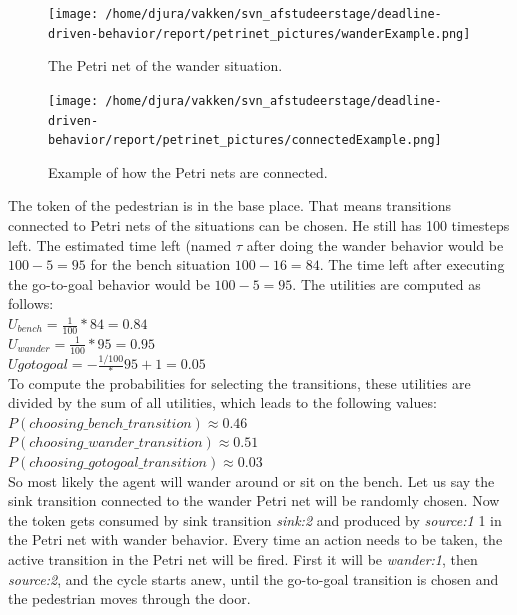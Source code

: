 \documentclass[11pt, a4paper]{book}
\begin{document}
\begin{figure}[h!]
\centering            
\texttt{[image: /home/djura/vakken/svn\_afstudeerstage/deadline-driven-behavior/report/petrinet\_pictures/wanderExample.png]}
\caption{The Petri net of the wander situation.}
\label{fig:wanderSituationNet}
\end{figure}

\begin{figure}[h!]
\centering            
\texttt{[image: /home/djura/vakken/svn\_afstudeerstage/deadline-driven-behavior/report/petrinet\_pictures/connectedExample.png]}
\caption{Example of how the Petri nets are connected.}
\label{fig:connectedExample}
\end{figure}

The token of the pedestrian is in the base place. That means transitions connected to Petri nets of the situations can be chosen. He still has 100 timesteps left. The estimated time left (named $\tau$ after doing the wander behavior would be $100 - 5=95$ for the bench situation $100-16=84$. The time left after executing the go-to-goal behavior would be $100-5=95$. The utilities are computed as follows:\\
$U_{bench}=\frac{1}{100} * 84 = 0.84$  \\
$U_{wander}=\frac{1}{100} * 95=0.95 $\\
$U{gotogoal}=-\frac{1/100} * 95 + 1 =0.05$\\

To compute the probabilities for selecting the transitions, these utilities are divided by the sum of all utilities, which leads to the following values:\\
$P(choosing\_bench\_transition)\approx 0.46$\\
$P(choosing\_wander\_transition)\approx 0.51$\\
$P(choosing\_gotogoal\_transition)\approx 0.03$\\
So most likely the agent will wander around or sit on the bench. Let us say the sink transition connected to the wander Petri net will be randomly chosen. Now the token gets consumed by sink transition \emph{sink:2} and produced by \emph{source:1} 1 in the Petri net with wander behavior. Every time an action needs to be taken, the active transition in the Petri net will be fired. First it will be \emph{wander:1}, then \emph{source:2}, and the cycle starts anew, until the go-to-goal transition is chosen and the pedestrian moves through the door.

 
\end{document}
